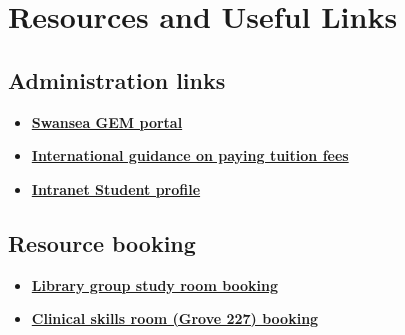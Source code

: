 \chapter{Resources and Useful Links}
\label{ch:useful_links}

\section{Administration links}
\label{sec:administration_links}

\begin{itemize}
    \item \href{https://scs.swan.ac.uk/gem/UnitLogIn.php}{\textbf{Swansea GEM portal}}
    \item \href{https://www.swansea.ac.uk/finance-swansea-university/paying-tuition-fees-and-other-information/pay-fees-international-students/}{\textbf{International guidance on paying tuition fees}}
    \item \href{https://intranet.swan.ac.uk/studentprofile/profilesummarydetails.aspx}{\textbf{Intranet Student profile}}
\end{itemize}

\section{Resource booking}

\begin{itemize}
    \item \href{https://swansea-uk.libcal.com/reserve/splgroupstudy}{\textbf{Library group study room booking}}
    \item \href{https://signup.com/go/vATMqTQ}{\textbf{Clinical skills room (Grove 227) booking}}
\end{itemize}

